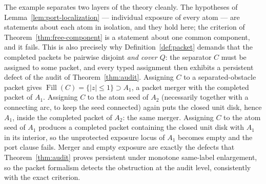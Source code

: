 \documentclass[11pt,reqno]{amsart}
\theoremstyle{definition}
\theoremstyle{remark}
\newcommand{\Fill}{\operatorname{Fill}}
\begin{document}
The example separates two layers of the theory cleanly. The hypotheses of
Lemma~\ref{lem:port-localization} --- individual exposure of every atom --- are
statements about each atom in isolation, and they hold here; the criterion of
Theorem~\ref{thm:free-component} is a statement about one common component, and it
fails. This is also precisely why Definition~\ref{def:packet} demands that the
completed packets be pairwise disjoint \emph{and cover $Q$}: the separator $C$ must be
assigned to some packet, and every typed assignment then exhibits a persistent defect
of the audit of Theorem~\ref{thm:audit}. Assigning $C$ to a separated-obstacle packet
gives $\Fill(C)=\{|z|\le1\}\supset A_1$, a packet merger with the completed packet of
$A_1$. Assigning $C$ to the atom seed of $A_2$ (necessarily together with a connecting
arc, to keep the seed connected) again puts the closed unit disk, hence $A_1$, inside
the completed packet of $A_2$: the same merger. Assigning $C$ to the atom seed of $A_1$
produces a completed packet containing the closed unit disk with $A_1$ in its interior,
so the unprotected exposure locus of $A_1$ becomes empty and the port clause fails.
Merger and empty exposure are exactly the defects that Theorem~\ref{thm:audit} proves
persistent under monotone same-label enlargement, so the packet formalism detects the
obstruction at the audit level, consistently with the exact criterion.
\end{document}

